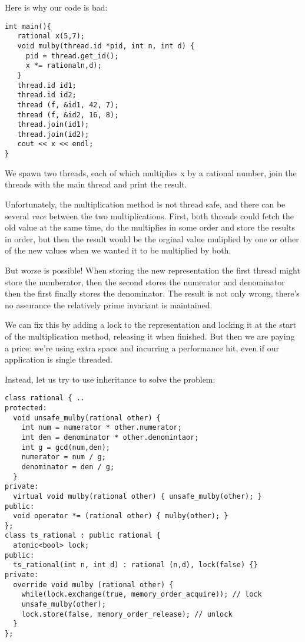 \documentclass[oneside]{book}
\begin{document}
Here is why our code is bad:
\begin{verbatim}
int main(){
   rational x(5,7);
   void mulby(thread.id *pid, int n, int d) { 
     pid = thread.get_id(); 
     x *= rationaln,d);
   }
   thread.id id1;
   thread.id id2;
   thread (f, &id1, 42, 7);
   thread (f, &id2, 16, 8);
   thread.join(id1);
   thread.join(id2);
   cout << x << endl;
}
\end{verbatim}

We spawn two threads, each of which multiplies x by a rational number,
join the threads with the main thread and print the result.

Unfortunately, the multiplication method is not thread safe, and there
can be several {\em race} between the two multiplications. First,
both threads could fetch the old value at the same time, do the multiplies
in some order and store the results in order, but then the result would
be the orginal value muliplied by one or other of the new values when
we wanted it to be multiplied by both.

But worse is possible! When storing the new representation the first thread
might store the numberator, then the second stores the numerator and
denominator then the first finally stores the denominator. The result is not
only wrong, there's no assurance the relatively prime invariant is maintained.

We can fix this by adding a lock to the representation and
locking it at the start of the multiplication method, releasing it
when finished. But then we are paying a price: we're using extra
space and incurring a performance hit, even if our application
is single threaded.

Instead, let us try to use inheritance to solve the problem:
\begin{verbatim}
class rational { ..
protected:
  void unsafe_mulby(rational other) {
    int num = numerator * other.numerator;
    int den = denominator * other.denomintaor;
    int g = gcd(num,den);
    numerator = num / g;
    denominator = den / g;
  }
private:
  virtual void mulby(rational other) { unsafe_mulby(other); }
public:
  void operator *= (rational other) { mulby(other); }
};
class ts_rational : public rational {
  atomic<bool> lock;
public:
  ts_rational(int n, int d) : rational (n,d), lock(false) {}
private:
  override void mulby (rational other) {
    while(lock.exchange(true, memory_order_acquire)); // lock
    unsafe_mulby(other);
    lock.store(false, memory_order_release); // unlock
  }
}; 
\end{verbatim}
\end{document}
